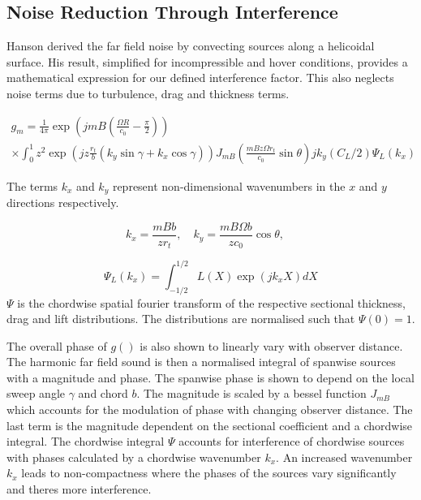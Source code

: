 \documentclass[12pt,a4paper]{article}
\begin{document}
\subsection{Noise Reduction Through Interference}

Hanson \cite{hanson_theory} derived the far field noise by convecting sources along a helicoidal surface.
His result, simplified for incompressible and hover conditions, provides a mathematical expression for our defined interference factor.
This also neglects noise terms due to turbulence, drag and thickness terms.

\begin{equation}
    \begin{aligned}
        g_m = \frac{1}{4\pi} \exp\left(jmB \left( \frac{\Omega R}{c_0} - \frac{\pi}{2} \right)\right) \\
        \times \int_0^1 z^2 \exp \left(j z \frac{r_t}{b} \left(k_y \sin \gamma + k_x \cos \gamma\right) \right) J_{mB} \left( \frac{mB z \Omega r_t}{c_0} \sin \theta \right)
            jk_y (C_L / 2) \Psi_L(k_x)
    \end{aligned}
    \label{eq:hansons_result}
\end{equation}

The terms $k_x$ and $k_y$ represent non-dimensional wavenumbers in the $x$ and $y$ directions respectively.

\begin{equation}
    k_x = \frac{mB b}{z r_t}, \quad
    k_y = \frac{mB\Omega b}{z c_0} \cos \theta, \quad
\end{equation}

\begin{equation}
    \Psi_L(k_x) = \int_{-1/2}^{1/2} L(X) \exp(jk_x X) dX
\end{equation}
$\Psi$ is the chordwise spatial fourier transform of the respective sectional thickness, drag and lift distributions.
The distributions are normalised such that $\Psi(0) = 1$.

The overall phase of $g()$ is also shown to linearly vary with observer distance.
The harmonic far field sound is then a normalised integral of spanwise sources with a magnitude and phase.
The spanwise phase is shown to depend on the local sweep angle $\gamma$ and chord $b$.
The magnitude is scaled by a bessel function $J_{mB}$ which accounts for the modulation of phase with changing observer distance.
The last term is the magnitude dependent on the sectional coefficient and a chordwise integral.
The chordwise integral $\Psi$ accounts for interference of chordwise sources with phases calculated by a chordwise wavenumber $k_x$.
An increased wavenumber $k_x$ leads to non-compactness where the phases of the sources vary significantly and theres more interference.
\end{document}
